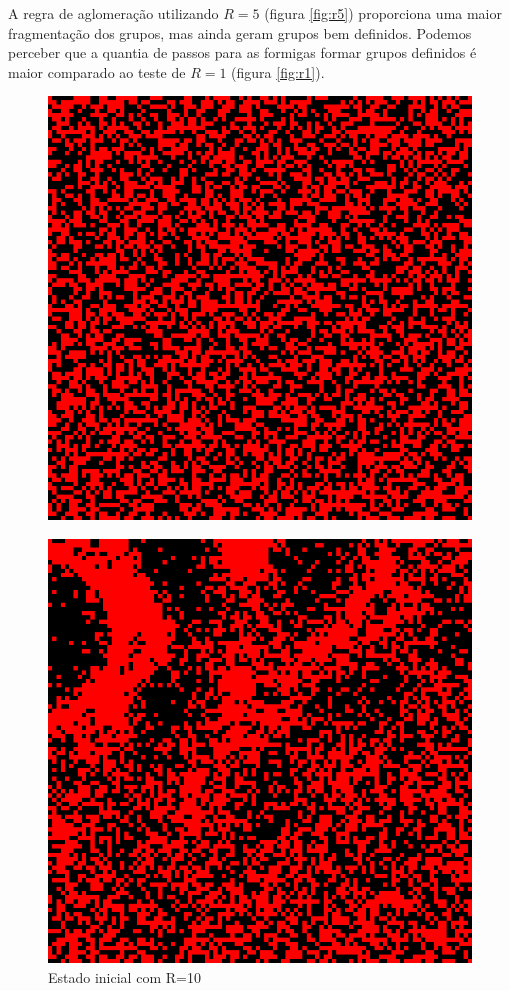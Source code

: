 \documentclass[conference]{IEEEtran}
\begin{document}
A regra de aglomeração utilizando $R=5$ (figura \ref{fig:r5}) proporciona uma maior fragmentação dos grupos, mas ainda geram grupos bem definidos. Podemos perceber que a quantia de passos para as formigas formar grupos definidos é maior comparado ao teste de $R=1$ (figura \ref{fig:r1}).

\begin{figure}[H] 
  \begin{minipage}[b]{0.5\linewidth}
    \label{fig:r10}
    \centering
    \includegraphics[width=.8\linewidth]{resultados/10-0.png} 
    \caption{Estado inicial com R=10} 
    \vspace{4ex}
  \end{minipage}%
  \begin{minipage}[b]{0.5\linewidth}
    \centering
    \includegraphics[width=.8\linewidth]{resultados/10-1.png} 

\end{minipage}
\end{figure}
\end{document}
